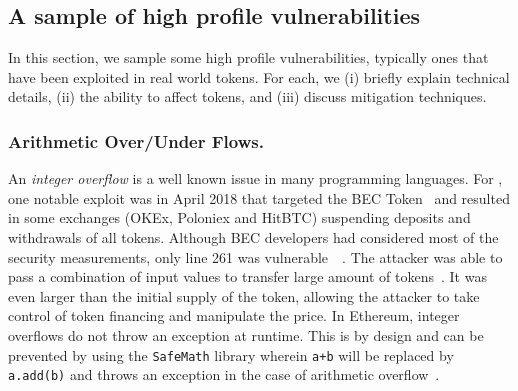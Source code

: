 

\subsection{A sample of high profile vulnerabilities}\label{sec:vul}
In this section, we sample some high profile vulnerabilities, typically ones that have been exploited in real world \erc tokens. For each, we (i) briefly explain technical details, (ii) the ability to affect \erc tokens, and (iii) discuss mitigation techniques. 

\subsubsection{Arithmetic Over/Under Flows.}\label{sec:ovf}
An \textit{integer overflow} is a well known issue in many programming languages. For \erc, one notable exploit was in April 2018 that targeted the BEC Token~\cite{BECToken} and resulted in some exchanges (\eg OKEx, Poloniex and HitBTC) suspending deposits and withdrawals of all tokens. Although BEC developers had considered most of the security measurements, only line 261 was vulnerable~\cite{Osiris}~\cite{PeckShield}. The attacker was able to pass a combination of input values to transfer large amount of tokens~\cite{Overflow}. It was even larger than the initial supply of the token, allowing the attacker to take control of token financing and manipulate the price. In Ethereum, integer overflows do not throw an exception at runtime. This is by design and can be prevented by using the \texttt{SafeMath} library wherein \texttt{a+b} will be replaced by \texttt{a.add(b)} and throws an exception in the case of arithmetic overflow~\cite{SafeMath}.

